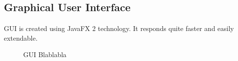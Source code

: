 \subsection{Graphical User Interface}

\paragraph{}GUI is created using JavaFX 2 technology. It responds quite faster and easily  extendable.

\begin{figure}[h!]
\centering
\caption{GUI Blablabla}
\end{figure}
